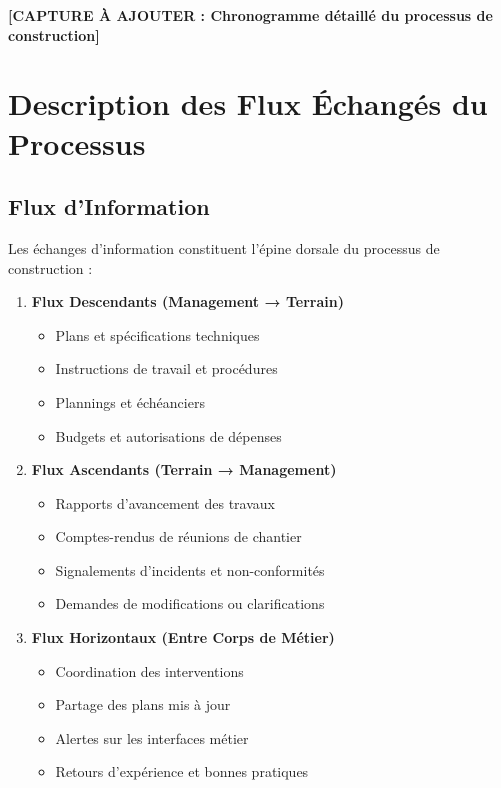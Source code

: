 \textbf{[CAPTURE À AJOUTER : Chronogramme détaillé du processus de construction]}

\section{Description des Flux Échangés du Processus}

\subsection{Flux d'Information}

Les échanges d'information constituent l'épine dorsale du processus de construction :

\begin{enumerate}
    \item \textbf{Flux Descendants (Management → Terrain)}
    \begin{itemize}
        \item Plans et spécifications techniques
        \item Instructions de travail et procédures
        \item Plannings et échéanciers
        \item Budgets et autorisations de dépenses
    \end{itemize}
    
    \item \textbf{Flux Ascendants (Terrain → Management)}
    \begin{itemize}
        \item Rapports d'avancement des travaux
        \item Comptes-rendus de réunions de chantier
        \item Signalements d'incidents et non-conformités
        \item Demandes de modifications ou clarifications
    \end{itemize}
    
    \item \textbf{Flux Horizontaux (Entre Corps de Métier)}
    \begin{itemize}
        \item Coordination des interventions
        \item Partage des plans mis à jour
        \item Alertes sur les interfaces métier
        \item Retours d'expérience et bonnes pratiques
    \end{itemize}
\end{enumerate}

